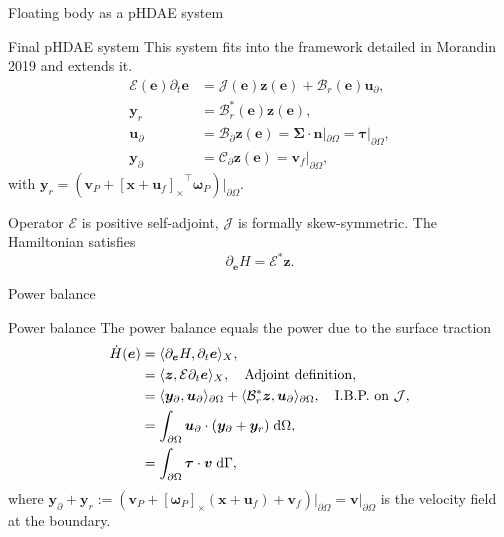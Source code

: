 \documentclass[aspectratio=169]{ISAE-Beamer}
\newcommand{\crmat}[1]{\ensuremath{\left[#1\right]_\times}}
\begin{document}
\begin{frame}{Floating body as a pHDAE system}
\begin{exampleblock}{Final pHDAE system}
	This system fits into the framework detailed in Morandin 2019  and extends it.
	\begin{equation*}
	\begin{aligned}
	\mathcal{E}(\bm{e}) \partial_t \bm{e} &= \mathcal{J}(\bm{e}) \bm{z}(\bm{e}) + {\mathcal{B}}_r(\bm{e}) \bm{u}_\partial, \\
	\bm{y}_r &= {\mathcal{B}}_r^*(\bm{e}) \bm{z}(\bm{e}), \\
	\bm{u}_\partial &= {\mathcal{B}}_{\partial} \bm{z}(\bm{e}) =  \bm\Sigma \cdot \bm{n}|_{\partial \Omega} = \bm\tau|_{\partial \Omega}, \\
	\bm{y}_\partial &= {\mathcal{C}}_{\partial} \bm{z}(\bm{e}) = \bm{v}_f|_{\partial \Omega},
	\end{aligned}
	\end{equation*}
	with $\bm{y}_r = (\bm{v}_P + \crmat{\bm{x}+\bm{u}_f}^\top \bm{\omega}_P)\vert_{\partial\Omega}$.
\end{exampleblock}
Operator ${\mathcal{E}}$ is positive self-adjoint, ${\mathcal{J}}$ is formally skew-symmetric.
The Hamiltonian  satisfies 
\begin{equation*}
\partial_{\bm{e}} H = {\mathcal{E}}^* \bm{z}.
\end{equation*}
\end{frame}

\begin{frame}{Power balance}

\begin{exampleblock}{Power balance}
	The power balance equals the power due to the surface traction
	\begin{equation*}
	\setlength{\abovedisplayskip}{5pt}
	\setlength{\belowdisplayskip}{5pt}
	\begin{aligned}
	\dot{H}(\bm{e}) &= \langle \partial_{\bm{e}} H, \partial_t {\bm{e}} \rangle_{X},\\
	&= \langle \bm{z}, {\mathcal{E}} \partial_t {\bm{e}} \rangle_{{X}}, \quad \text{Adjoint definition},  \\
	&= \langle \bm{y}_\partial,  \bm{u}_\partial \rangle_{\partial\Omega} + \langle {\mathcal{B}}_r^* \bm{z}, \bm{u}_\partial \rangle_{\partial\Omega}, \quad \text{I.B.P. on } {\mathcal{J}}, \\
	&=  \int_{\partial \Omega} \bm{u}_\partial \cdot (\bm{y}_\partial + \bm{y}_r)  \d{\Omega}, \\
	&= \int_{\partial \Omega} \bm\tau \cdot \bm{v} \d\Gamma,  \\
	\end{aligned}
	\end{equation*}
	where $\bm{y}_\partial + \bm{y}_r := (\bm{v}_P + \crmat{\bm{\omega}_P} (\bm{x}+\bm{u}_f) + {\bm{v}}_f)\vert_{\partial\Omega} = \bm{v}\vert_{\partial\Omega}$ is the velocity field at the boundary.
\end{exampleblock}

\end{frame}
\end{document}
